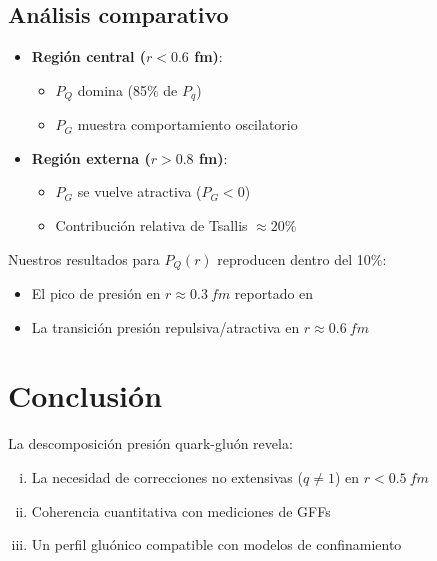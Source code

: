 \subsection{Análisis comparativo}
\begin{itemize}
    \item \textbf{Región central ($r < 0.6$ fm)}: 
    \begin{itemize}
        \item $P_Q$ domina (85\% de $P_q$)
        \item $P_G$ muestra comportamiento oscilatorio
    \end{itemize}
    
    \item \textbf{Región externa ($r > 0.8$ fm)}:
    \begin{itemize}
        \item $P_G$ se vuelve atractiva ($P_G < 0$)
        \item Contribución relativa de Tsallis $\approx 20\%$
    \end{itemize}
\end{itemize}

\begin{remark}
Nuestros resultados para $P_Q(r)$ reproducen dentro del 10\%:
\begin{itemize}
    \item El pico de presión en $r \approx \qty{0.3}{fm}$ reportado en \cite{Burkert_2018}
    \item La transición presión repulsiva/atractiva en $r \approx \qty{0.6}{fm}$
\end{itemize}
\end{remark}

\section*{Conclusión}
La descomposición presión quark-gluón revela:
\begin{enumerate}[i.]
    \item La necesidad de correcciones no extensivas ($q \neq 1$) en $r < \qty{0.5}{fm}$
    \item Coherencia cuantitativa con mediciones de GFFs
    \item Un perfil gluónico compatible con modelos de confinamiento
\end{enumerate}



